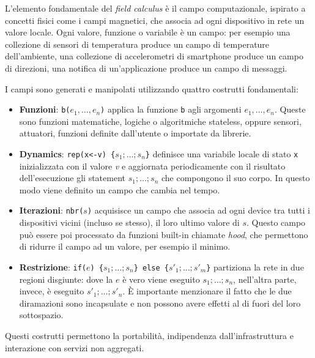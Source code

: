 L'elemento fondamentale del \textit{field calculus} è il campo computazionale,
ispirato a concetti fisici come i campi magnetici, che associa ad ogni
dispositivo in rete un valore locale. Ogni valore, funzione o variabile è un
campo: per esempio una collezione di sensori di temperatura produce un campo di
temperature dell'ambiente, una collezione di accelerometri di smartphone produce
un campo di direzioni, una notifica di un'applicazione produce un campo di
messaggi.

I campi sono generati e manipolati utilizzando quattro costrutti fondamentali:
\begin{itemize}
\item \textbf{Funzioni}: \texttt{b($e_1,\ldots, e_n$)} applica la funzione \texttt{b}
  agli argomenti \texttt{$e_1,\ldots, e_n$}. Queste sono funzioni matematiche,
  logiche o algoritmiche stateless, oppure sensori, attuatori, funzioni definite
  dall'utente o importate da librerie.

\item \textbf{Dynamics}: \texttt{rep(x<-v) \{$s_1;\ldots;s_n$\}} definisce una variabile
  locale di stato \texttt{x} inizializzata con il valore \textit{v} e aggiornata
  periodicamente con il risultato dell'esecuzione gli statement
  \texttt{{$s_1;\ldots;s_n$}} che compongono il suo corpo. In questo modo viene
  definito un campo che cambia nel tempo.

\item \textbf{Iterazioni}: \texttt{nbr($s$)} acquisisce un campo che associa ad ogni
  device tra tutti i dispositivi vicini (incluso se stesso), il loro ultimo
  valore di \texttt{$s$}. Questo campo può essere poi processato da funzioni
  built-in chiamate \textit{hood}, che permettono di ridurre il campo ad un
  valore, per esempio il minimo.

\item \textbf{Restrizione}: \texttt{if($e$) \{$s_1;\ldots;s_n$\} else
    \{$s'_1;\ldots;s'_m$\}} partiziona la rete in due regioni disgiunte: dove la
  \texttt{$e$} è vero viene eseguito \texttt{$s_1;\ldots;s_n$}, nell'altra parte,
  invece, è eseguito \texttt{$s'_1;\ldots;s'_n$}. È importante menzionare il
  fatto che le due diramazioni sono incapsulate e non possono avere effetti al
  di fuori del loro sottospazio.
\end{itemize}

Questi costrutti permettono la portabilità, indipendenza dall'infrastruttura e
interazione con servizi non aggregati.

